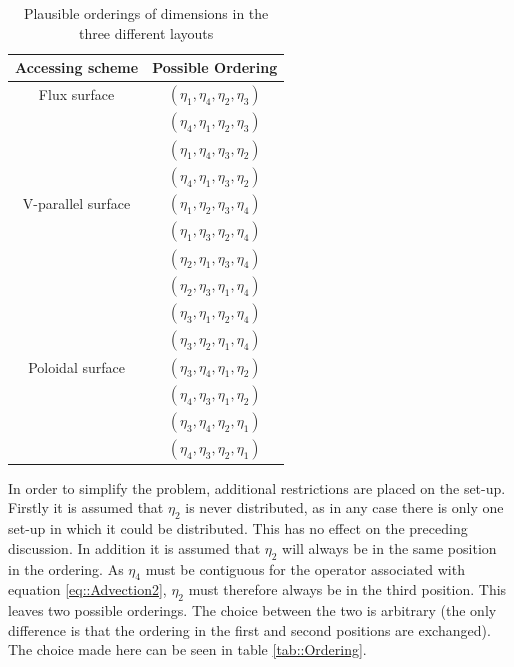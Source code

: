 \begin{table}[ht]
\centering
 \begin{tabular}{|c|c|}
  \hline
  Accessing scheme & Possible Ordering\\
  \hline
  Flux surface & $(\eta_1,\eta_4,\eta_2,\eta_3)$\\
               & $(\eta_4,\eta_1,\eta_2,\eta_3)$\\
               & $(\eta_1,\eta_4,\eta_3,\eta_2)$\\
               & $(\eta_4,\eta_1,\eta_3,\eta_2)$\\
  \hline
  V-parallel surface & $(\eta_1,\eta_2,\eta_3,\eta_4)$\\
                     & $(\eta_1,\eta_3,\eta_2,\eta_4)$\\
                     & $(\eta_2,\eta_1,\eta_3,\eta_4)$\\
                     & $(\eta_2,\eta_3,\eta_1,\eta_4)$\\
                     & $(\eta_3,\eta_1,\eta_2,\eta_4)$\\
                     & $(\eta_3,\eta_2,\eta_1,\eta_4)$\\
  \hline
  Poloidal surface & $(\eta_3,\eta_4,\eta_1,\eta_2)$\\
                   & $(\eta_4,\eta_3,\eta_1,\eta_2)$\\
                   & $(\eta_3,\eta_4,\eta_2,\eta_1)$\\
                   & $(\eta_4,\eta_3,\eta_2,\eta_1)$\\
  \hline
 \end{tabular}
 \caption{\label{tab::Possible Ordering} Plausible orderings of dimensions in the three different layouts}
\end{table}

In order to simplify the problem, additional restrictions are placed on the set-up. Firstly it is assumed that $\eta_2$ is never distributed, as in any case there is only one set-up in which it could be distributed. This has no effect on the preceding discussion. In addition it is assumed that $\eta_2$ will always be in the same position in the ordering. As $\eta_4$ must be contiguous for the operator associated with equation \ref{eq::Advection2}, $\eta_2$ must therefore always be in the third position. This leaves two possible orderings. The choice between the two is arbitrary (the only difference is that the ordering in the first and second positions are exchanged). The choice made here can be seen in table \ref{tab::Ordering}.

